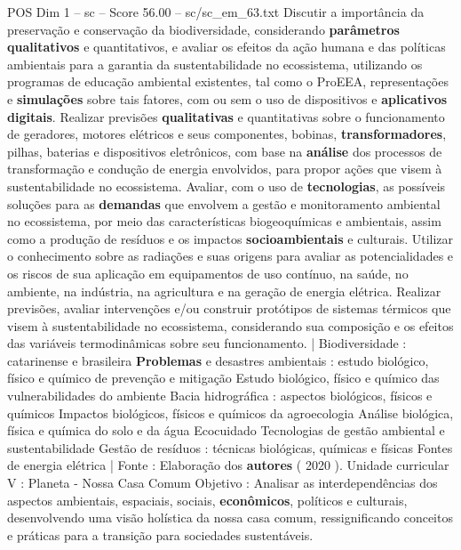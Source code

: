 \begin{textsample}{POS Dim 1 – sc – Score 56.00 – sc/sc\_em\_63.txt}
Discutir a importância da preservação e conservação da biodiversidade, considerando \textbf{parâmetros} \textbf{qualitativos} e quantitativos, e avaliar os efeitos da ação humana e das políticas ambientais para a garantia da sustentabilidade no ecossistema, utilizando os programas de educação ambiental existentes, tal como o ProEEA, representações e \textbf{simulações} sobre tais fatores, com ou sem o uso de dispositivos e \textbf{aplicativos} \textbf{digitais}.
Realizar previsões \textbf{qualitativas} e quantitativas sobre o funcionamento de geradores, motores elétricos e seus componentes, bobinas, \textbf{transformadores}, pilhas, baterias e dispositivos eletrônicos, com base na \textbf{análise} dos processos de transformação e condução de energia envolvidos, para propor ações que visem à sustentabilidade no ecossistema.
Avaliar, com o uso de \textbf{tecnologias}, as possíveis soluções para as \textbf{demandas} que envolvem a gestão e monitoramento ambiental no ecossistema, por meio das características biogeoquímicas e ambientais, assim como a produção de resíduos e os impactos \textbf{socioambientais} e culturais.
Utilizar o conhecimento sobre as radiações e suas origens para avaliar as potencialidades e os riscos de sua aplicação em equipamentos de uso contínuo, na saúde, no ambiente, na indústria, na agricultura e na geração de energia elétrica.
Realizar previsões, avaliar intervenções e/ou construir protótipos de sistemas térmicos que visem à sustentabilidade no ecossistema, considerando sua composição e os efeitos das variáveis termodinâmicas sobre seu funcionamento. | Biodiversidade : catarinense e brasileira \textbf{Problemas} e desastres ambientais : estudo biológico, físico e químico de prevenção e mitigação Estudo biológico, físico e químico das vulnerabilidades do ambiente Bacia hidrográfica : aspectos biológicos, físicos e químicos Impactos biológicos, físicos e químicos da agroecologia Análise biológica, física e química do solo e da água Ecocuidado Tecnologias de gestão ambiental e sustentabilidade Gestão de resíduos : técnicas biológicas, químicas e físicas Fontes de energia elétrica | Fonte : Elaboração dos \textbf{autores} ( 2020 ).
Unidade curricular V : Planeta - Nossa Casa Comum Objetivo : Analisar as interdependências dos aspectos ambientais, espaciais, sociais, \textbf{econômicos}, políticos e culturais, desenvolvendo uma visão holística da nossa casa comum, ressignificando conceitos e práticas para a transição para sociedades sustentáveis.

\end{textsample}
